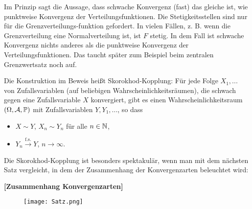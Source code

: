 Im Prinzip sagt die Aussage, dass schwache Konvergenz (fast) das gleiche ist, wie punktweise Konvergenz der Verteilungsfunktionen. Die Stetigkeitsstellen sind nur f\"ur die Grenzverteilungs-funktion gefordert. In vielen F\"allen, z. B. wenn die Grenzverteilung eine Normalverteilung ist, ist $F$ stetig. In dem Fall ist schwache Konvergenz nichts anderes als die punktweise Konvergenz der Verteilungsfunktionen. Das taucht sp\"ater zum Beispiel beim zentralen Grenzwertsatz noch auf.
\begin{bem}
	Die Konstruktion im Beweis heißt Skorokhod-Kopplung: Für jede Folge $X_1, ...$ von Zufallsvariablen (auf beliebigen Wahrscheinlichkeitsr\"aumen), die schwach gegen eine Zufallsvariable $X$ konvergiert, gibt es einen Wahrscheinlichkeitsraum $(\Omega, \mathcal{A}, \mathbb{P})$ mit Zufallsvariablen $Y, Y_1,...$, so dass
	\begin{itemize}
		\item $X \sim Y$, $X_n \sim Y_n$ f\"ur alle $n\in\mathbb{N}$,
		\item $Y_n \overset{\text{f.s.}}{\longrightarrow} Y$, $n \to \infty$.
	\end{itemize}
\end{bem}
Die Skorokhod-Kopplung ist besonders spektakul\"ar, wenn man mit dem n\"achsten Satz vergleicht, 
in dem der Zusammenhang der Konvergenzarten beleuchtet wird:
\begin{satz}\label{Konvergenzsatz}
 \textbf{[Zusammenhang Konvergenzarten]}
\begin{figure}[H]
\begin{center}
\texttt{[image: Satz.png]}
\end{center}
\end{figure}
\end{satz}


